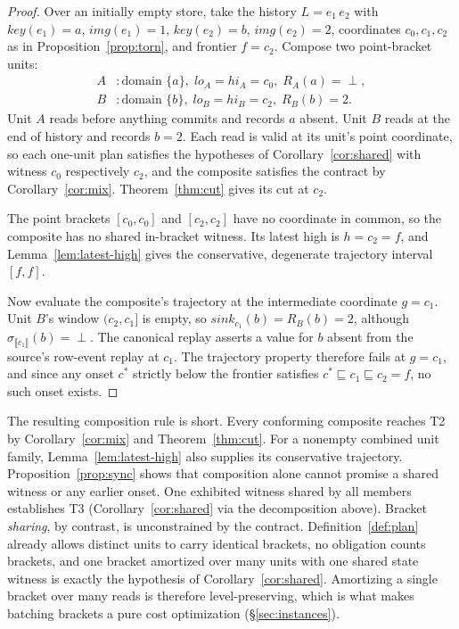 \documentclass[sigconf,nonacm,10pt]{acmart}
\theoremstyle{plain}
\theoremstyle{definition}
\newcommand{\den}[1]{\llbracket #1 \rrbracket}   %
\newcommand{\pre}{\sqsubseteq}                   %
\newcommand{\window}[2]{(#1,#2]}                 %
\newcommand{\keyof}{\mathit{key}}                %
\newcommand{\imgof}{\mathit{img}}                %
\newcommand{\sink}{\mathit{sink}}                %
\begin{document}
\begin{proof}
Over an initially empty store, take the history $L = e_1\, e_2$
with $\keyof(e_1) = a$, $\imgof(e_1) = 1$, $\keyof(e_2) = b$,
$\imgof(e_2) = 2$, coordinates $c_0, c_1, c_2$ as in
Proposition~\ref{prop:torn}, and frontier $f = c_2$. Compose two
point-bracket units:
\[
\begin{aligned}
A &: \text{domain } \{a\},\; lo_A = hi_A = c_0,\; R_A(a) = \perp,\\
B &: \text{domain } \{b\},\; lo_B = hi_B = c_2,\; R_B(b) = 2.
\end{aligned}
\]
Unit $A$ reads before anything commits and records $a$
absent. Unit $B$ reads at the end of history and records
$b = 2$. Each read is valid at its unit's point coordinate, so
each one-unit plan satisfies the hypotheses of Corollary~\ref{cor:shared} 
with witness $c_0$ respectively $c_2$, and the composite satisfies
the contract by Corollary~\ref{cor:mix}. Theorem~\ref{thm:cut}
gives its cut at $c_2$.

The point brackets $[c_0,c_0]$ and $[c_2,c_2]$ have no coordinate in
common, so the composite has no shared in-bracket witness. Its latest
high is $h=c_2=f$, and Lemma~\ref{lem:latest-high} gives the
conservative, degenerate trajectory interval $[f,f]$.

Now evaluate the composite's trajectory at the intermediate
coordinate $g = c_1$. Unit $B$'s window $\window{c_2}{c_1}$ is
empty, so $\sink_{c_1}(b) = R_B(b) = 2$, although
$\sigma_{\den{c_1}}(b) = \perp$. The canonical replay asserts a
value for $b$ absent from the source's row-event replay at $c_1$. The
trajectory property therefore fails at $g = c_1$, and since any
onset $c^{\ast}$ strictly below the frontier satisfies
$c^{\ast} \pre c_1 \pre c_2 = f$, no such onset exists.
\end{proof}

The resulting composition rule is short. Every conforming composite
reaches T2 by Corollary~\ref{cor:mix} and Theorem~\ref{thm:cut}. For a
nonempty combined unit family, Lemma~\ref{lem:latest-high} also supplies
its conservative trajectory.
Proposition~\ref{prop:sync} shows that composition alone cannot promise
a shared witness or any earlier onset. One exhibited witness shared by
all members establishes T3 (Corollary~\ref{cor:shared} via the
decomposition above). Bracket
\emph{sharing}, by contrast, is unconstrained by the contract.
Definition~\ref{def:plan} already allows distinct units to carry
identical brackets, no obligation counts brackets, and one bracket
amortized over many units with one shared state witness is exactly 
the hypothesis of Corollary~\ref{cor:shared}. Amortizing a single bracket 
over many reads is therefore level-preserving, which is what makes
batching brackets a pure cost optimization
(\S\ref{sec:instances}).
\end{document}
